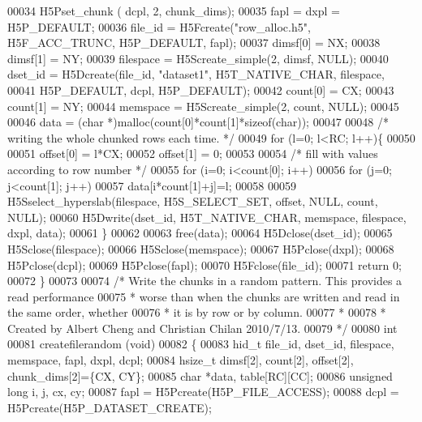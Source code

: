 \begin{DoxyCode}
00034     H5Pset\_chunk ( dcpl, 2, chunk\_dims);
00035     fapl = dxpl = H5P\_DEFAULT;
00036     file\_id = H5Fcreate(\textcolor{stringliteral}{"row\_alloc.h5"}, H5F\_ACC\_TRUNC, H5P\_DEFAULT, fapl);
00037     dimsf[0] = NX;
00038     dimsf[1] = NY;
00039     filespace = H5Screate\_simple(2, dimsf, NULL); 
00040     dset\_id = H5Dcreate(file\_id, \textcolor{stringliteral}{"dataset1"}, H5T\_NATIVE\_CHAR, filespace,
00041             H5P\_DEFAULT, dcpl, H5P\_DEFAULT);
00042     count[0] = CX;
00043     count[1] = NY;
00044     memspace = H5Screate\_simple(2, count, NULL);
00045 
00046     data = (\textcolor{keywordtype}{char} *)malloc(count[0]*count[1]*\textcolor{keyword}{sizeof}(\textcolor{keywordtype}{char}));
00047     
00048     \textcolor{comment}{/* writing the whole chunked rows each time. */}
00049     \textcolor{keywordflow}{for} (l=0; l<RC; l++)\{
00050 
00051         offset[0] = l*CX;
00052         offset[1] = 0;
00053 
00054     \textcolor{comment}{/* fill with values according to row number */}
00055     \textcolor{keywordflow}{for} (i=0; i<count[0]; i++)
00056         \textcolor{keywordflow}{for} (j=0; j<count[1]; j++)
00057         data[i*count[1]+j]=l;
00058 
00059         H5Sselect\_hyperslab(filespace, H5S\_SELECT\_SET, offset, NULL, count, NULL);
00060         H5Dwrite(dset\_id, H5T\_NATIVE\_CHAR, memspace, filespace, dxpl, data);
00061     \} 
00062  
00063     free(data);
00064     H5Dclose(dset\_id);
00065     H5Sclose(filespace);
00066     H5Sclose(memspace);
00067     H5Pclose(dxpl);
00068     H5Pclose(dcpl);
00069     H5Pclose(fapl);
00070     H5Fclose(file\_id);
00071     \textcolor{keywordflow}{return} 0;
00072 \}
00073 
00074 \textcolor{comment}{/* Write the chunks in a random pattern.  This provides a read performance}
00075 \textcolor{comment}{ * worse than when the chunks are written and read in the same order, whether}
00076 \textcolor{comment}{ * it is by row or by column.}
00077 \textcolor{comment}{ *}
00078 \textcolor{comment}{ * Created by Albert Cheng and Christian Chilan 2010/7/13.}
00079 \textcolor{comment}{ */}
00080 \textcolor{keywordtype}{int}
00081 createfilerandom (\textcolor{keywordtype}{void})
00082 \{
00083     hid\_t   file\_id, dset\_id, filespace, memspace, fapl, dxpl, dcpl;
00084     hsize\_t dimsf[2], count[2], offset[2], chunk\_dims[2]=\{CX, CY\};
00085     \textcolor{keywordtype}{char}     *data, table[RC][CC];               
00086     \textcolor{keywordtype}{unsigned} \textcolor{keywordtype}{long} i, j, cx, cy;
00087     fapl = H5Pcreate(H5P\_FILE\_ACCESS);
00088     dcpl = H5Pcreate(H5P\_DATASET\_CREATE);

\end{DoxyCode}
